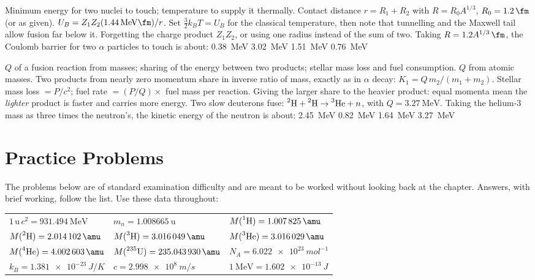 {Minimum energy for two nuclei to touch; temperature to supply it thermally.}
{Contact distance $r=R_1+R_2$ with $R=R_0A^{1/3}$, $R_0=\SI{1.2}{\fm}$ (or as given). $U_B=Z_1Z_2
(\SI{1.44}{\MeV\fm})/r$. Set $\tfrac32k_BT=U_B$ for the classical temperature, then note that tunnelling and
the Maxwell tail allow fusion far below it.}
{Forgetting the charge product $Z_1Z_2$, or using one radius instead of the sum of two.}
{Taking $R=1.2A^{1/3}\,\si{\fm}$, the Coulomb barrier for two $\alpha$ particles to touch is about:}
{\SI{0.38}{\MeV}}
{\SI{3.02}{\MeV}}
{\SI{1.51}{\MeV}}
{\SI{0.76}{\MeV}}

{$Q$ of a fusion reaction from masses; sharing of the energy between two products; stellar mass loss and
fuel consumption.}
{$Q$ from atomic masses. Two products from nearly zero momentum share in inverse ratio of mass, exactly as
in $\alpha$ decay: $K_1=Q\,m_2/(m_1+m_2)$. Stellar mass loss $=P/c^2$; fuel rate $=(P/Q)\times$ fuel mass
per reaction.}
{Giving the larger share to the heavier product: equal momenta mean the \emph{lighter} product is faster
and carries more energy.}
{Two slow deuterons fuse: $\prescript{2}{}{\mathrm{H}}+\prescript{2}{}{\mathrm{H}}\to\prescript{3}{}{\mathrm{He}}+n$, with $Q=\SI{3.27}{\MeV}$. Taking the
helium-3 mass as three times the neutron's, the kinetic energy of the neutron is about:}
{\SI{2.45}{\MeV}}
{\SI{0.82}{\MeV}}
{\SI{1.64}{\MeV}}
{\SI{3.27}{\MeV}}

\section{Practice Problems}\label{sec:react-practice}

The problems below are of standard examination difficulty and are meant to be worked without looking back
at the chapter. Answers, with brief working, follow the list. Use these data throughout:
\begin{center}\small
\begin{tabular}{@{}lll@{}}
$1\,\si{\amu}\,c^2=\SI{931.494}{\MeV}$ & $m_n=\SI{1.008665}{\amu}$ & $M(\iso{1}{H})=\SI{1.007825}{\amu}$\\
$M(\iso{2}{H})=\SI{2.014102}{\amu}$ & $M(\iso{3}{H})=\SI{3.016049}{\amu}$ & $M(\iso{3}{He})=\SI{3.016029}{\amu}$\\
$M(\iso{4}{He})=\SI{4.002603}{\amu}$ & $M(\iso{235}{U})=\SI{235.043930}{\amu}$ & $N_A=\SI{6.022e23}{mol^{-1}}$\\
$k_B=\SI{1.381e-23}{J/K}$ & $c=\SI{2.998e8}{m/s}$ & $\SI{1}{\MeV}=\SI{1.602e-13}{J}$
\end{tabular}
\end{center}


